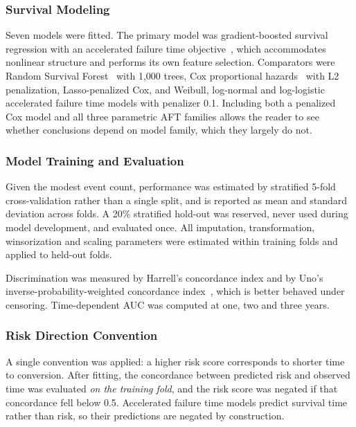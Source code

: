 \documentclass[blue]{ludusofficial}  %
\begin{document}
\subsubsection{Survival Modeling}

Seven models were fitted. The primary model was gradient-boosted survival regression with an accelerated failure time objective~\cite{barnwal2022survivalxgb}, which accommodates nonlinear structure and performs its own feature selection. Comparators were Random Survival Forest~\cite{ishwaran2008rsf} with 1,000 trees, Cox proportional hazards~\cite{cox1972} with L2 penalization, Lasso-penalized Cox, and Weibull, log-normal and log-logistic accelerated failure time models with penalizer 0.1. Including both a penalized Cox model and all three parametric AFT families allows the reader to see whether conclusions depend on model family, which they largely do not.

\subsubsection{Model Training and Evaluation}

Given the modest event count, performance was estimated by stratified 5-fold cross-validation rather than a single split, and is reported as mean and standard deviation across folds. A 20\% stratified hold-out was reserved, never used during model development, and evaluated once. All imputation, transformation, winsorization and scaling parameters were estimated within training folds and applied to held-out folds.

Discrimination was measured by Harrell's concordance index and by Uno's inverse-probability-weighted concordance index~\cite{uno2011cstat}, which is better behaved under censoring. Time-dependent AUC was computed at one, two and three years.

\subsubsection{Risk Direction Convention}

A single convention was applied: a higher risk score corresponds to shorter time to conversion. After fitting, the concordance between predicted risk and observed time was evaluated \textit{on the training fold}, and the risk score was negated if that concordance fell below 0.5. Accelerated failure time models predict survival time rather than risk, so their predictions are negated by construction.
\end{document}
